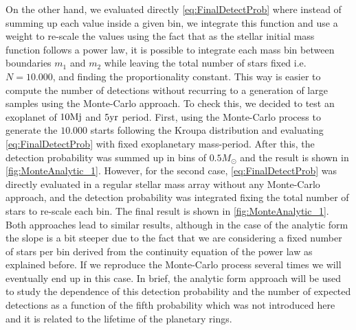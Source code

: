 On the other hand, we evaluated directly \autoref{eq:FinalDetectProb} where instead of summing up each value inside a given bin, we integrate this function and use a weight to re-scale the values using the fact that as the stellar initial mass function follows a power law, it is possible to integrate each mass bin between boundaries $m_1$ and $m_2$ while leaving the total number of stars fixed i.e. $N = 10.000$, and finding the proportionality constant. This way is easier to compute the number of detections without recurring to a generation of large samples using the Monte-Carlo approach. To check this, we decided to test an exoplanet of $10\textnormal{Mj}$ and $5\textnormal{yr}$ period. First, using the Monte-Carlo process to generate the $10.000$ starts following the Kroupa distribution and evaluating \autoref{eq:FinalDetectProb} with fixed exoplanetary mass-period. After this, the detection probability was summed up in bins of $0.5M_\odot$ and the result is shown in \autoref{fig:MonteAnalytic_1}. However, for the second case, \autoref{eq:FinalDetectProb} was directly evaluated in a regular stellar mass array without any Monte-Carlo approach, and the detection probability was integrated fixing the total number of stars to re-scale each bin. The final result is shown in \autoref{fig:MonteAnalytic_1}. Both approaches lead to similar results, although in the case of the analytic form the slope is a bit steeper due to the fact that we are considering a fixed number of stars per bin derived from the continuity equation of the power law as explained before. If we reproduce the Monte-Carlo process several times we will eventually end up in this case. In brief, the analytic form approach will be used to study the dependence of this detection probability and the number of expected detections as a function of the fifth probability which was not introduced here and it is related to the lifetime of the planetary rings.\\

